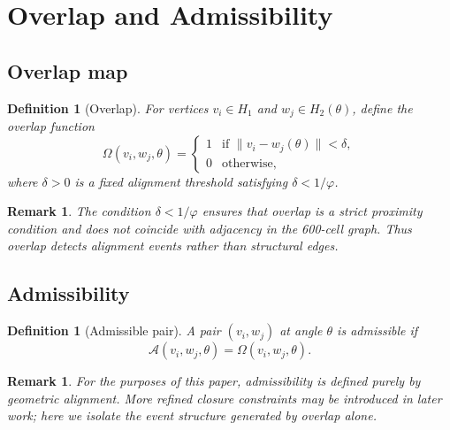 \documentclass[12pt]{article}
\newtheorem{definition}[theorem]{Definition}
\newtheorem{remark}[theorem]{Remark}
\newcommand{\Acal}{\mathcal{A}}
\begin{document}
\section{Overlap and Admissibility}\label{sec:overlap}

\subsection{Overlap map}

\begin{definition}[Overlap]\label{def:overlap}
For vertices $v_i \in H_1$ and $w_j \in H_2(\theta)$, define the overlap function
\begin{equation}\label{eq:overlap}
    \Omega(v_i, w_j, \theta) =
    \begin{cases}
        1 & \text{if } \|v_i - w_j(\theta)\| < \delta,\\
        0 & \text{otherwise},
    \end{cases}
\end{equation}
where $\delta > 0$ is a fixed alignment threshold satisfying $\delta < 1/\varphi$.
\end{definition}

\begin{remark}
The condition $\delta < 1/\varphi$ ensures that overlap is a strict proximity condition and does not coincide with adjacency in the 600-cell graph. Thus overlap detects alignment events rather than structural edges.
\end{remark}

\subsection{Admissibility}

\begin{definition}[Admissible pair]\label{def:admissible}
A pair $(v_i, w_j)$ at angle $\theta$ is \emph{admissible} if
\begin{equation}
    \Acal(v_i, w_j, \theta) = \Omega(v_i, w_j, \theta).
\end{equation}
\end{definition}

\begin{remark}
For the purposes of this paper, admissibility is defined purely by geometric alignment. More refined closure constraints may be introduced in later work; here we isolate the event structure generated by overlap alone.
\end{remark}
\end{document}
